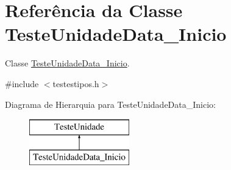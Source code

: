 \hypertarget{class_teste_unidade_data___inicio}{
\section{\-Referência da \-Classe \-Teste\-Unidade\-Data\-\_\-\-Inicio}
\label{class_teste_unidade_data___inicio}
}


\-Classe \hyperlink{class_teste_unidade_data___inicio}{\-Teste\-Unidade\-Data\-\_\-\-Inicio}.  




{\ttfamily \#include $<$testestipos.\-h$>$}

\-Diagrama de \-Hierarquia para \-Teste\-Unidade\-Data\-\_\-\-Inicio\-:\begin{figure}[H]
\begin{center}
\leavevmode
\includegraphics[height=2.000000cm]{class_teste_unidade_data___inicio}
\end{center}
\end{figure}
